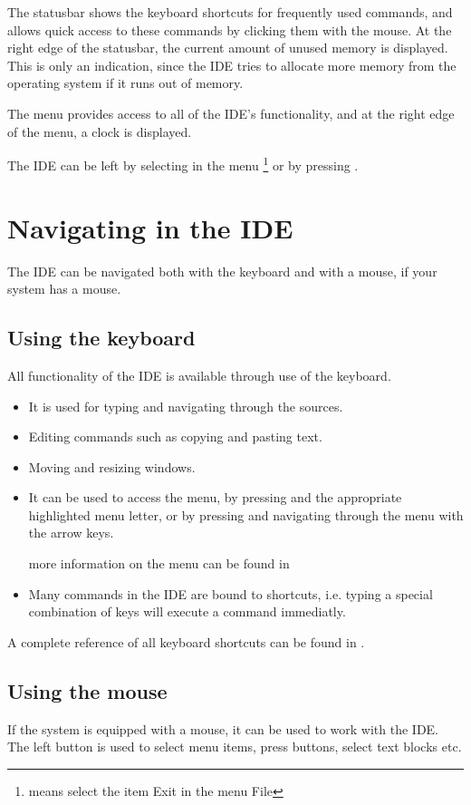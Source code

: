 The statusbar shows the keyboard shortcuts for frequently used 
commands, and allows quick access to these commands by clicking 
them with the mouse. 
At the right edge of the statusbar, the current amount of unused 
memory is displayed. This is only an indication, since the IDE 
tries to allocate more memory from the operating system if it 
runs out of memory.

The menu provides access to all of the IDE's functionality, and
at the right edge of the menu, a clock is displayed.

The IDE can be left by selecting  in the menu
\footnote{ means select the item Exit in the menu File}
or by pressing .

\section{Navigating in the IDE}
The IDE can be navigated both with the keyboard and with a mouse, if your
system has a mouse.

\subsection{Using the keyboard} 
All functionality of the IDE is available through use of the keyboard.
\begin{itemize}
\item It is used for typing and navigating through the sources.
\item Editing commands such as copying and pasting text.
\item Moving and resizing windows.
\item It can be used to access the menu, by pressing  and the
appropriate highlighted menu letter, or by pressing  and
navigating through the menu with the arrow keys.

more information on the menu can be found in 
\item Many commands in the IDE are bound to shortcuts, i.e. typing a special
combination of keys will execute a command immediatly.
\end{itemize}
\begin{remark}
A complete reference of all keyboard shortcuts can be found in
.
\end{remark}

\subsection{Using the mouse}
\label{suse:mouseusage}
If the system is equipped with a mouse, it can be used to work with the
IDE. The left button is used to select menu items, press buttons, select
text blocks etc. 

